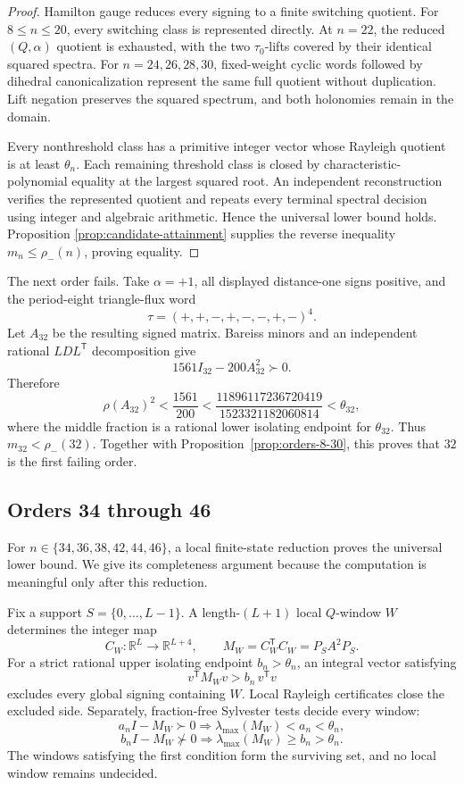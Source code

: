 \begin{proof}
Hamilton gauge reduces every signing to a finite switching quotient.  For
\(8\leq n\leq20\), every switching class is represented directly.  At
\(n=22\), the reduced \((Q,\alpha)\) quotient is exhausted, with the two
\(\tau_0\)-lifts covered by their identical squared spectra.  For
\(n=24,26,28,30\), fixed-weight cyclic words followed by dihedral
canonicalization represent the same full quotient without duplication.
Lift negation preserves the squared spectrum, and both holonomies remain in
the domain.

Every nonthreshold class has a primitive integer vector whose Rayleigh
quotient is at least \(\theta_n\).  Each remaining threshold class is closed
by characteristic-polynomial equality at the largest squared root.
An independent reconstruction verifies the represented quotient and repeats
every terminal spectral decision using integer and algebraic arithmetic.
Hence the universal lower bound holds.  Proposition
\ref{prop:candidate-attainment} supplies the reverse inequality
\(m_n\leq\rho_-(n)\), proving equality.
\end{proof}

The next order fails.  Take \(\alpha=+1\), all displayed distance-one signs
positive, and the period-eight triangle-flux word
\[
\tau=(+,+,-,+,-,-,+,-)^4.
\]
Let \(A_{32}\) be the resulting signed matrix. Bareiss minors and an
independent rational \(LDL^{\mathsf T}\) decomposition give
\[
1561I_{32}-200A_{32}^2\succ0.
\]
Therefore
\[
\rho(A_{32})^2<\frac{1561}{200}
<\frac{11896117236720419}{1523321182060814}
<\theta_{32},
\]
where the middle fraction is a rational lower isolating endpoint for
\(\theta_{32}\).  Thus \(m_{32}<\rho_-(32)\).  Together with
Proposition~\ref{prop:orders-8-30}, this proves that \(32\) is the first
failing order.

\subsection{Orders 34 through 46}
\label{subsec:orders-34-46}

For \(n\in\{34,36,38,42,44,46\}\), a local finite-state reduction proves the
universal lower bound.  We give its completeness argument because the
computation is meaningful only after this reduction.

Fix a support \(S=\{0,\ldots,L-1\}\).  A length-\((L+1)\) local \(Q\)-window
\(W\) determines the integer map
\[
C_W:\mathbb R^L\longrightarrow\mathbb R^{L+4},
\qquad
M_W=C_W^{\mathsf T}C_W=P_SA^2P_S.
\]
For a strict rational upper isolating endpoint \(b_n>\theta_n\), an integral
vector satisfying
\[
v^{\mathsf T}M_Wv>b_n\,v^{\mathsf T}v
\]
excludes every global signing containing \(W\). Local Rayleigh certificates
close the excluded side. Separately, fraction-free
Sylvester tests decide every window:
\[
a_nI-M_W\succ0\Longrightarrow\lambda_{\max}(M_W)<a_n<\theta_n,
\]
\[
b_nI-M_W\not\succ0\Longrightarrow
\lambda_{\max}(M_W)\geq b_n>\theta_n.
\]
The windows satisfying the first condition form the surviving set, and no
local window remains undecided.

